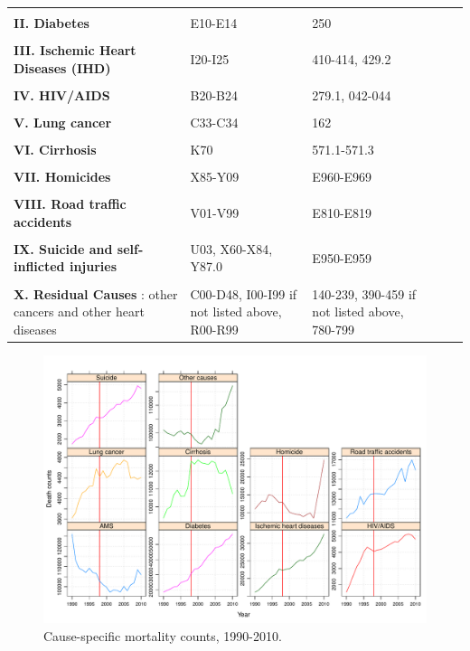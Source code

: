 \documentclass[11.5pt]{article}
\begin{document}
{\begin{longtable}{p{8cm}p{4cm}p{4cm}ccc}
 & \\          
 {\bf II. Diabetes}  & E10-E14 & 250 \\      
 & \\
 {\bf III. Ischemic Heart Diseases (IHD)}   & I20-I25 & 410-414, 429.2\\
 & \\           
 {\bf IV. HIV/AIDS} & B20-B24 & 279.1, 042-044\\ 
  & \\                
{\bf V. Lung cancer}  & C33-C34 & 162\\
  & \\          
{\bf VI. Cirrhosis}&  K70 & 571.1-571.3\\
 & \\          
{\bf VII. Homicides}  & X85-Y09 & E960-E969\\     
 & \\           
 {\bf VIII. Road traffic accidents}  & V01-V99 & E810-E819 \\     
 & \\           
{\bf IX. Suicide and self-inflicted injuries}  & U03, X60-X84, Y87.0 & E950-E959\\ 
 & \\          
{\bf X. Residual Causes }:  other cancers and other heart diseases & C00-D48, I00-I99 if not listed above, R00-R99 & 140-239, 390-459 if not listed above, 780-799
\label{ME_Mex}
\end{longtable}

\begin{figure}
\centering
\caption{Cause-specific mortality counts, 1990-2010.}
\label{fig:ClassSens}
\includegraphics[scale=.6]{Figures/Class_fig.pdf}


\end{figure}}
\end{document}
